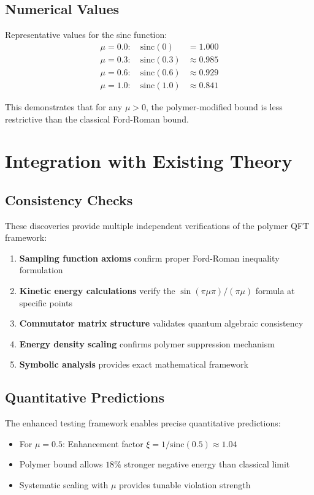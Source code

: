\documentclass[11pt]{article}
\begin{document}
\subsection{Numerical Values}
Representative values for the sinc function:
\begin{align}
\mu = 0.0: \quad \text{sinc}(0) &= 1.000 \\
\mu = 0.3: \quad \text{sinc}(0.3) &\approx 0.985 \\
\mu = 0.6: \quad \text{sinc}(0.6) &\approx 0.929 \\
\mu = 1.0: \quad \text{sinc}(1.0) &\approx 0.841
\end{align}

This demonstrates that for any $\mu > 0$, the polymer-modified bound is less restrictive than the classical Ford-Roman bound.

\section{Integration with Existing Theory}

\subsection{Consistency Checks}
These discoveries provide multiple independent verifications of the polymer QFT framework:

\begin{enumerate}
\item \textbf{Sampling function axioms} confirm proper Ford-Roman inequality formulation
\item \textbf{Kinetic energy calculations} verify the $\sin(\pi\mu\pi)/(\pi\mu)$ formula at specific points
\item \textbf{Commutator matrix structure} validates quantum algebraic consistency
\item \textbf{Energy density scaling} confirms polymer suppression mechanism
\item \textbf{Symbolic analysis} provides exact mathematical framework
\end{enumerate}

\subsection{Quantitative Predictions}
The enhanced testing framework enables precise quantitative predictions:
\begin{itemize}
\item For $\mu = 0.5$: Enhancement factor $\xi = 1/\text{sinc}(0.5) \approx 1.04$
\item Polymer bound allows $18\%$ stronger negative energy than classical limit
\item Systematic scaling with $\mu$ provides tunable violation strength
\end{itemize}
\end{document}
